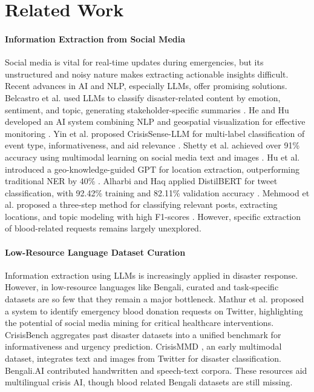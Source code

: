 \documentclass[11pt]{article}
\begin{document}
\section{Related Work}\label{sec_rl}
\paragraph{Information Extraction from Social Media}Social media is vital for real-time updates during emergencies, but its unstructured and noisy nature makes extracting actionable insights difficult. Recent advances in AI and NLP, especially LLMs, offer promising solutions. Belcastro et al. \cite{Belcastro2025multi} used LLMs to classify disaster-related content by emotion, sentiment, and topic, generating stakeholder-specific summaries \cite{Belcastro2025multi}. He and Hu developed an AI system combining NLP and geospatial visualization for effective monitoring \cite{he2025social}. Yin et al. proposed CrisisSense-LLM for multi-label classification of event type, informativeness, and aid relevance \cite{yin2024crisissense}. Shetty et al. achieved over 91\% accuracy using multimodal learning on social media text and images \cite{shetty2024disaster}. Hu et al. introduced a geo-knowledge-guided GPT for location extraction, outperforming traditional NER by 40\% \cite{hu2023geo}. Alharbi and Haq applied DistilBERT for tweet classification, with 92.42\% training and 82.11\% validation accuracy \cite{alharbi2024enhancing}. Mehmood et al. proposed a three-step method for classifying relevant posts, extracting locations, and topic modeling with high F1-scores \cite{mehmood2024named}. However, specific extraction of blood-related requests remains largely unexplored.
\paragraph{Low-Resource Language Dataset Curation}
Information extraction using LLMs is increasingly applied in disaster response. However, in low-resource languages like Bengali, curated and task-specific datasets are so few \cite{acl1hasan-etal-2020-low, fahim2024banglatlit} that they remain a major bottleneck. Mathur et al. \cite{ebdr-twitter} proposed a system to identify emergency blood donation requests on Twitter, highlighting the potential of social media mining for critical healthcare interventions. CrisisBench \cite{crisis-bench} aggregates past disaster datasets into a unified benchmark for informativeness and urgency prediction. CrisisMMD \cite{crisismmd2018}, an early multimodal dataset, integrates text and images from Twitter for disaster classification. Bengali.AI \cite{bengaliai2020} contributed handwritten and speech-text corpora. These resources aid multilingual crisis AI, though blood related Bengali datasets are still missing.
\end{document}
